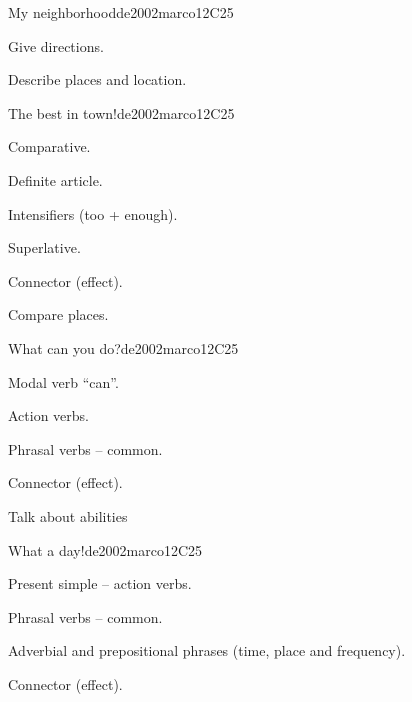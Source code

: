 \begin{syllabus}
\begin{unit}{My neighborhood}{}{de2002marco}{12}{C25}
   \begin{learningoutcomes}
      \item Give directions.
      \item Describe places and location.
   \end{learningoutcomes}
\end{unit}

\begin{unit}{The best in town!}{}{de2002marco}{12}{C25}
   \begin{topics}
      \item Comparative.
      \item Definite article.
      \item Intensifiers (too + enough).
      \item Superlative.
      \item Connector (effect).
   \end{topics}

   \begin{learningoutcomes}
      \item Compare places.
   \end{learningoutcomes}
\end{unit}

\begin{unit}{What can you do?}{}{de2002marco}{12}{C25}
   \begin{topics}
      \item Modal verb “can”.
      \item Action verbs.
      \item Phrasal verbs – common.
      \item Connector (effect).
   \end{topics}

   \begin{learningoutcomes}
      \item Talk about abilities
   \end{learningoutcomes}
\end{unit}

\begin{unit}{What a day!}{}{de2002marco}{12}{C25}
   \begin{topics}
      \item Present simple – action verbs.
      \item Phrasal verbs – common.
      \item Adverbial and prepositional phrases (time, place and frequency).
      \item Connector (effect).
   \end{topics}


\end{unit}
\end{syllabus}
